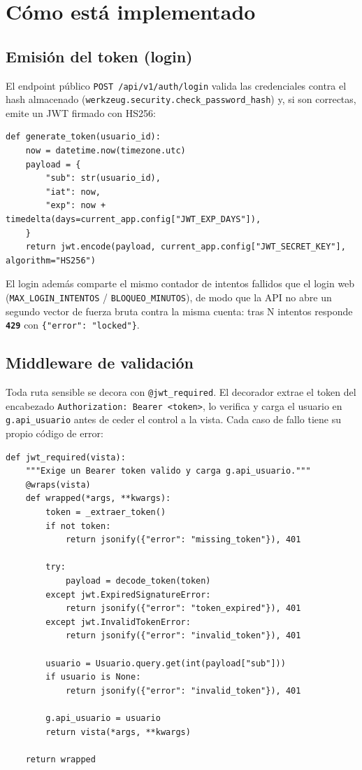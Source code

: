 \documentclass[11pt,letterpaper]{article}
\newcommand{\http}[2]{\textcolor{#1}{\texttt{\textbf{#2}}}}
\begin{document}
\section{Cómo está implementado}

\subsection{Emisión del token (login)}

El endpoint público \texttt{POST /api/v1/auth/login} valida las credenciales contra el
hash almacenado (\texttt{werkzeug.security.check\_password\_hash}) y, si son correctas,
emite un JWT firmado con HS256:

\begin{lstlisting}[style=python,caption={\texttt{auth\_jwt.py} — generación del token.}]
def generate_token(usuario_id):
    now = datetime.now(timezone.utc)
    payload = {
        "sub": str(usuario_id),
        "iat": now,
        "exp": now + timedelta(days=current_app.config["JWT_EXP_DAYS"]),
    }
    return jwt.encode(payload, current_app.config["JWT_SECRET_KEY"], algorithm="HS256")
\end{lstlisting}

El login además comparte el mismo contador de intentos fallidos que el login web
(\texttt{MAX\_LOGIN\_INTENTOS} / \texttt{BLOQUEO\_MINUTOS}), de modo que la API no abre un
segundo vector de fuerza bruta contra la misma cuenta: tras N intentos responde
\http{qcRed}{429} con \texttt{\{"error": "locked"\}}.

\subsection{Middleware de validación}

Toda ruta sensible se decora con \texttt{@jwt\_required}. El decorador extrae el token del
encabezado \texttt{Authorization: Bearer <token>}, lo verifica y carga el usuario en
\texttt{g.api\_usuario} antes de ceder el control a la vista. Cada caso de fallo tiene su
propio código de error:

\begin{lstlisting}[style=python,caption={\texttt{auth\_jwt.py} — middleware de autenticación.}]
def jwt_required(vista):
    """Exige un Bearer token valido y carga g.api_usuario."""
    @wraps(vista)
    def wrapped(*args, **kwargs):
        token = _extraer_token()
        if not token:
            return jsonify({"error": "missing_token"}), 401

        try:
            payload = decode_token(token)
        except jwt.ExpiredSignatureError:
            return jsonify({"error": "token_expired"}), 401
        except jwt.InvalidTokenError:
            return jsonify({"error": "invalid_token"}), 401

        usuario = Usuario.query.get(int(payload["sub"]))
        if usuario is None:
            return jsonify({"error": "invalid_token"}), 401

        g.api_usuario = usuario
        return vista(*args, **kwargs)

    return wrapped
\end{lstlisting}
\end{document}
